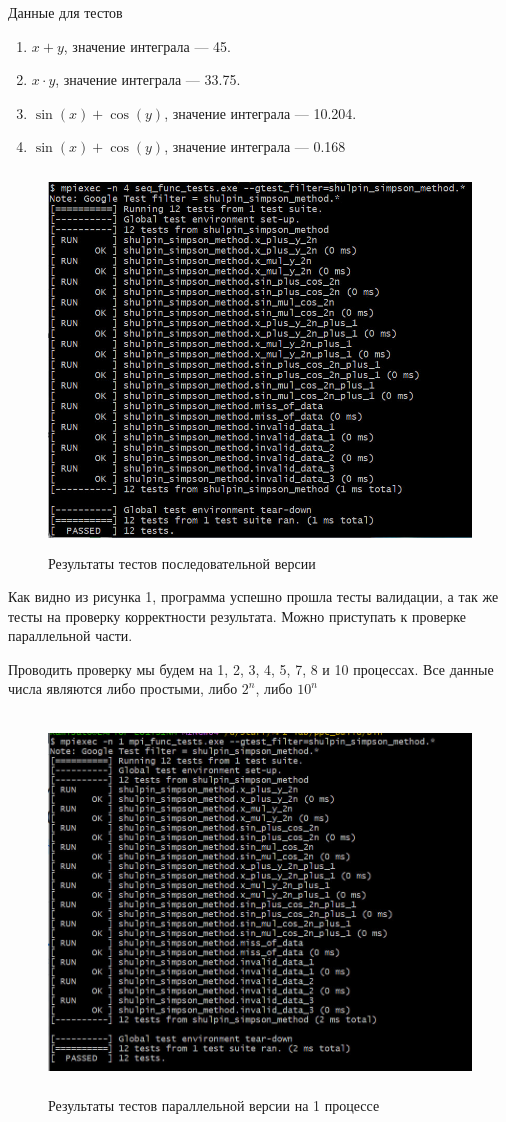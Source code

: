 \documentclass[12pt,a4paper]{article}
\begin{document}
Данные для тестов
\begin{enumerate}
    \item $x + y$, значение интеграла --- 45.
    \item $x \cdot y$, значение интеграла --- 33.75.
    \item $\sin(x) + \cos(y)$, значение интеграла --- 10.204.
    \item $\sin(x) + \cos(y)$, значение интеграла --- 0.168
\end{enumerate}

\begin{figure}[H]
\centering
\includegraphics[height=10cm]{img/seqfunctests.jpg}
\caption{\label{fig:visualClass} Результаты тестов последовательной версии}
\end{figure}

Как видно из рисунка 1, программа успешно прошла тесты валидации, а так же тесты на проверку корректности результата. Можно приступать к проверке параллельной части.

Проводить проверку мы будем на 1, 2, 3, 4, 5, 7, 8 и 10 процессах. Все данные числа являются либо простыми, либо \(2^{n}\), либо \(10^{n}\)

\begin{figure}[H]
\centering
\includegraphics[height=10cm]{img/1nmpitest.jpg}
\caption{\label{fig:visualClass} Результаты тестов параллельной версии на 1 процессе}
\end{figure}
\end{document}
